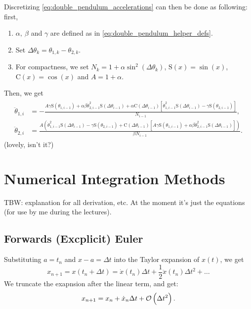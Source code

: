 \newcommand{\Si}{\text{S}}
\newcommand{\Co}{\text{C}}
Discretizing \autoref{eq:double_pendulum_accelerations} can then be done as following: first,
\begin{enumerate}
	\item $\alpha,\ \beta$ and $\gamma$ are defined as in \autoref{eq:double_pendulum_helper_defs}.
	\item Set $\Delta\theta_{k} = \theta_{1,k} - \theta_{2,k}$.
	\item For compactness, we set $N_{k} = 1+\alpha\sin^{2}\left(\Delta\theta_{k}\right)$, $\Si(x)=\sin(x)$, $\Co(x)=\cos(x)$ and $A=1+\alpha$.
\end{enumerate}
Then, we get
\begin{align}
	\begin{split}
		\ddot{\theta}_{1,i} & = -\frac{A\gamma\Si(\theta_{1,i-1})+\alpha\beta\dot{\theta}_{2,i-1}^{2}\Si\left(\Delta\theta_{i-1}\right) + \alpha\Co\left(\Delta\theta_{i-1}\right)\left[\dot{\theta}_{1,i-1}^{2}\Si\left(\Delta\theta_{i-1}\right)-\gamma\Si\left(\theta_{2,i-1}\right)\right]}{N_{i-1}},                       \\
		\ddot{\theta}_{2,i} & = \frac{A\left(\dot{\theta}_{1,i-1}^{2}\Si\left(\Delta\theta_{i-1}\right)-\gamma\Si\left(\theta_{2,i-1}\right)+\Co\left(\Delta\theta_{i-1}\right)\left[A\gamma\Si\left(\theta_{1,i-1}\right)+\alpha\beta\dot{\theta}_{2,i-1}^{2}\Si\left(\Delta\theta_{i-1}\right)\right]\right)}{\beta N_{i-1}}.
	\end{split}
\end{align}
(lovely, isn't it?)

\section{Numerical Integration Methods}
TBW: explanation for all derivation, etc. At the moment it's just the equations (for use by me during the lectures).
\subsection{Forwards (Excplicit) Euler}
Substituting $a=t_{n}$ and  $x-a=\Delta t$ into the Taylor expansion of $x(t)$, we get
\begin{equation}
	x_{n+1} = x\left(t_n+\Delta t\right) = \dot{x}\left(t_{n}\right)\Delta t + \frac{1}{2}\ddot{x}\left(t_{n}\right)\Delta t^{2} + \dots
	\label{eq:Taylor_expansion_forward_Euler}
\end{equation}
We truncate the exapnsion after the linear term, and get:
\begin{equation}
	x_{n+1} = x_{n}+\dot{x}_{n}\Delta t + \mathcal{O}\left(\Delta t^{2}\right).
	\label{eq:Taylor_expansion_forward_Euler_trunc}
\end{equation}

